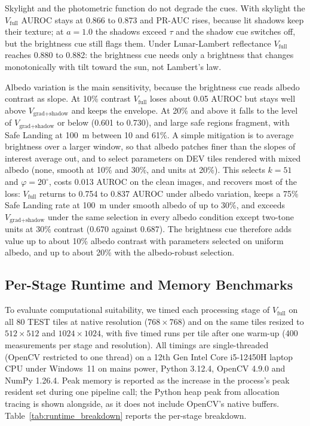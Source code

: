 \documentclass{article}
\begin{document}
Skylight and the photometric function do not degrade the cues. With skylight the $V_{\text{full}}$ AUROC stays at 0.866 to 0.873 and PR-AUC rises, because lit shadows keep their texture; at $a = 1.0$ the shadows exceed $\tau$ and the shadow cue switches off, but the brightness cue still flags them. Under Lunar-Lambert reflectance $V_{\text{full}}$ reaches 0.880 to 0.882: the brightness cue needs only a brightness that changes monotonically with tilt toward the sun, not Lambert's law.

Albedo variation is the main sensitivity, because the brightness cue reads albedo contrast as slope. At 10\% contrast $V_{\text{full}}$ loses about 0.05 AUROC but stays well above $V_{\text{grad+shadow}}$ and keeps the envelope. At 20\% and above it falls to the level of $V_{\text{grad+shadow}}$ or below (0.601 to 0.730), and large safe regions fragment, with Safe Landing at 100~m between 10 and 61\%. A simple mitigation is to average brightness over a larger window, so that albedo patches finer than the slopes of interest average out, and to select parameters on DEV tiles rendered with mixed albedo (none, smooth at 10\% and 30\%, and units at 20\%). This selects $k = 51$ and $\varphi = 20^\circ$, costs 0.013 AUROC on the clean images, and recovers most of the loss: $V_{\text{full}}$ returns to 0.754 to 0.837 AUROC under albedo variation, keeps a 75\% Safe Landing rate at 100~m under smooth albedo of up to 30\%, and exceeds $V_{\text{grad+shadow}}$ under the same selection in every albedo condition except two-tone units at 30\% contrast (0.670 against 0.687). The brightness cue therefore adds value up to about 10\% albedo contrast with parameters selected on uniform albedo, and up to about 20\% with the albedo-robust selection.

\subsection{Per-Stage Runtime and Memory Benchmarks}
To evaluate computational suitability, we timed each processing stage of $V_{\text{full}}$ on all 80 TEST tiles at native resolution ($768 \times 768$) and on the same tiles resized to $512 \times 512$ and $1024 \times 1024$, with five timed runs per tile after one warm-up (400 measurements per stage and resolution). All timings are single-threaded (OpenCV restricted to one thread) on a 12th Gen Intel Core i5-12450H laptop CPU under Windows~11 on mains power, Python 3.12.4, OpenCV 4.9.0 and NumPy 1.26.4. Peak memory is reported as the increase in the process's peak resident set during one pipeline call; the Python heap peak from allocation tracing is shown alongside, as it does not include OpenCV's native buffers. Table~\ref{tab:runtime_breakdown} reports the per-stage breakdown.
\end{document}
